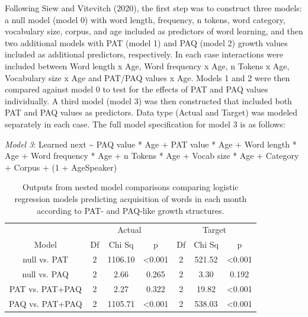 \documentclass[
  man,mask,floatsintext]{apa6}
\begin{document}
Following Siew and Vitevitch (2020), the first step was to construct three models: a null model (model 0) with word length, frequency, n tokens, word category, vocabulary size, corpus, and age included as predictors of word learning, and then two additional models with PAT (model 1) and PAQ (model 2) growth values included as additional predictors, respectively. In each case interactions were included between Word length x Age, Word frequency x Age, n Tokens x Age, Vocabulary size x Age and PAT/PAQ values x Age. Models 1 and 2 were then compared against model 0 to test for the effects of PAT and PAQ values individually. A third model (model 3) was then constructed that included both PAT and PAQ values as predictors. Data type (Actual and Target) was modeled separately in each case. The full model specification for model 3 is as follows:

\emph{Model 3}: Learned next \textasciitilde{} PAQ value * Age +
PAT value * Age +
Word length * Age +
Word frequency * Age +
n Tokens * Age +
Vocab size * Age +
Category +
Corpus +
(1 + Age\textbar Speaker)

\begin{longtable}[t]{ccccccc}
\caption{\label{tab:table-model-outputs}Outputs from nested model comparisons comparing logistic regression models predicting acquisition of words in each month according to PAT- and PAQ-like growth structures.}\\
\toprule
\multicolumn{1}{c}{ } & \multicolumn{3}{c}{Actual} & \multicolumn{3}{c}{Target} \\
\cmidrule(l{3pt}r{3pt}){2-4} \cmidrule(l{3pt}r{3pt}){5-7}
Model & Df & Chi Sq & p & Df & Chi Sq & p\\
\midrule
null vs. PAT & 2 & 1106.10 & <0.001 & 2 & 521.52 & <0.001\\
null vs. PAQ & 2 & 2.66 & 0.265 & 2 & 3.30 & 0.192\\
PAT vs. PAT+PAQ & 2 & 2.27 & 0.322 & 2 & 19.82 & <0.001\\
PAQ vs. PAT+PAQ & 2 & 1105.71 & <0.001 & 2 & 538.03 & <0.001\\
\midrule
\bottomrule
\end{longtable}
\end{document}
